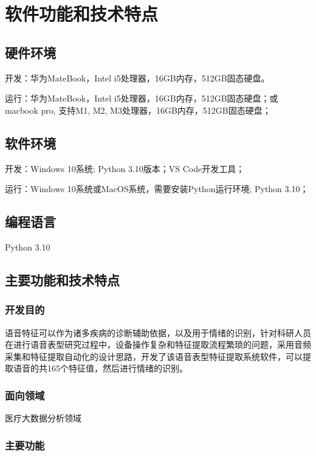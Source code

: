 \documentclass[lang=cn,newtx,12pt,scheme=chinese]{elegantbook}
\begin{document}
\section{软件功能和技术特点}

\subsection{硬件环境}

开发：华为MateBook，Intel i5处理器，16GB内存，512GB固态硬盘。

运行：华为MateBook，Intel i5处理器，16GB内存，512GB固态硬盘；或macbook pro, 支持M1, M2, M3处理器，16GB内存，512GB固态硬盘；


\subsection{软件环境}

开发：Windows 10系统; Python 3.10版本；VS Code开发工具；

运行：Windows 10系统或MacOS系统，需要安装Python运行环境; Python 3.10；


\subsection{编程语言}

Python 3.10

\subsection{主要功能和技术特点}

\subsubsection{开发目的}

语音特征可以作为诸多疾病的诊断辅助依据，以及用于情绪的识别，针对科研人员在进行语音表型研究过程中，设备操作复杂和特征提取流程繁琐的问题，采用音频采集和特征提取自动化的设计思路，开发了该语音表型特征提取系统软件，可以提取语音的共165个特征值，然后进行情绪的识别。

\subsubsection{面向领域}

医疗大数据分析领域

\subsubsection{主要功能}
\end{document}
